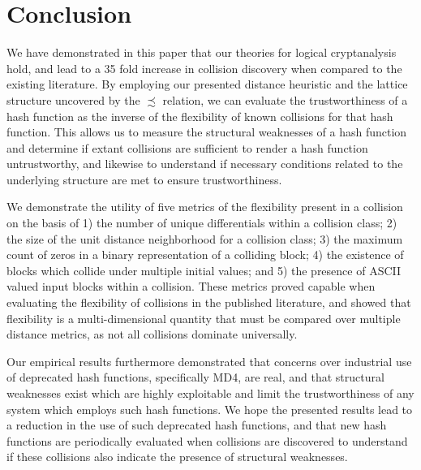 \documentclass[conference]{IEEEtran}
\begin{document}




\section{Conclusion} \label{Sec:Conclusion}

We have demonstrated in this paper that our theories for logical
cryptanalysis hold, and lead to a 35 fold increase in collision
discovery when compared to the existing literature.  By employing our
presented distance heuristic and the lattice structure uncovered by
the $\precsim$ relation, we can evaluate the trustworthiness of a hash
function as the inverse of the flexibility of known collisions for
that hash function.  This allows us to measure the structural
weaknesses of a hash function and determine if extant collisions are sufficient
to render a hash function untrustworthy, and likewise to understand if
necessary conditions related to the underlying structure are met to
ensure trustworthiness.

We demonstrate the utility of five metrics of the flexibility present
in a collision on the basis of 1) the number of unique differentials
within a collision class; 2) the size of the unit distance
neighborhood for a collision class; 3) the maximum count of zeros in a
binary representation of a colliding block; 4) the existence of blocks
which collide under multiple initial values; and 5) the presence of
ASCII valued input blocks within a collision.  These metrics proved
capable when evaluating the flexibility of collisions in the published
literature, and showed that flexibility is a multi-dimensional
quantity that must be compared over multiple distance metrics, as not all
collisions dominate universally.

Our empirical results furthermore demonstrated that concerns over
industrial use of deprecated hash functions, specifically MD4, are
real, and that structural weaknesses exist which are highly
exploitable and limit the trustworthiness of any system which employs
such hash functions.  We hope the presented results lead to a
reduction in the use of such deprecated hash functions, and that new
hash functions are periodically evaluated when collisions are
discovered to understand if these collisions also indicate the
presence of structural weaknesses.
\end{document}
